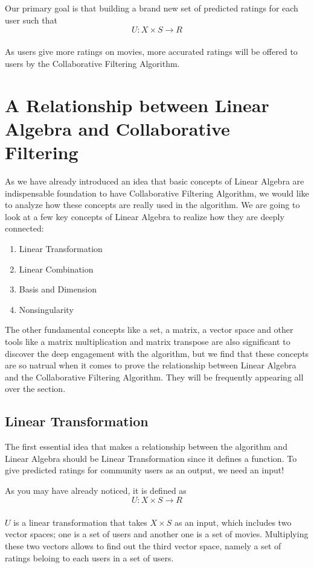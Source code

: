 \documentclass[paper=a4, fontsize=12pt]{scrartcl} %
\numberwithin{equation}{section} %
\numberwithin{figure}{section} %
\numberwithin{table}{section} %
\newcommand{\arrow}[1] {\xrightarrow[]{\text{#1}}}
\begin{document}
	Our primary goal is that building a brand new set of predicted ratings for
  each user such that 
  \[
    U : X \times S \arrow{} R
  \]

  As users give more ratings on movies, more accurated ratings will be offered
  to users by the Collaborative Filtering Algorithm.

  \section{A Relationship between Linear Algebra and Collaborative Filtering}

  As we have already introduced an idea that basic concepts of Linear Algebra are
  indispensable foundation to have Collaborative Filtering Algorithm, we would
  like to analyze how these concepts are really used in the algorithm. We are
  going to look at a few key concepts of Linear Algebra to realize how they are
  deeply connected:
  \begin{enumerate}
  \item Linear Transformation
  \item Linear Combination
  \item Basis and Dimension
  \item Nonsingularity
  \end{enumerate}

  The other fundamental concepts like a set, a matrix, a vector space and other
  tools like a matrix multiplication and matrix transpose are also significant
  to discover the deep engagement with the algorithm, but we find that these
  concepts are so natrual when it comes to prove the relationship between Linear
  Algebra and the Collaborative Filtering Algorithm. They will be frequently
  appearing all over the section. \\

  \subsection{Linear Transformation}

  The first essential idea that makes a relationship between the algorithm and
  Linear Algebra should be Linear Transformation since it defines a function. To
  give predicted ratings for community users as an output, we need an input!

  As you may have already noticed, it is defined as
  \[
    U : X \times S \arrow{} R
  \]

  \(U\) is a linear transformation that takes \(X \times S\) as an input, which
  includes two vector spaces; one is a set of users and another one is a set of
  movies. Multiplying these two vectors allows to find out the third vector
  space, namely a set of ratings beloing to each users in a set of users. \\
\end{document}
